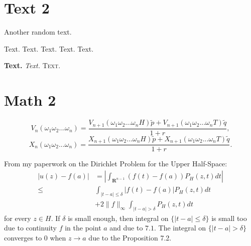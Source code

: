 \documentclass{article}
\begin{document}
\section{Text 2}

Another random text.

\large{Text.} \Large{Text.} \LARGE{Text.} \Large{Text.} \large{Text.}

\textbf{Text.} \textit{Text.} \textsc{Text.}

\section{Math 2}

\begin{equation}\nonumber
    V_{n}(\omega_1\omega_2...\omega_n)=\frac{V_{n+1}(\omega_1\omega_2...\omega_n H)\widetilde{p} + V_{n+1}(\omega_1\omega_2...\omega_n T)\widetilde{q}}{1+r},
\end{equation}
\begin{equation}\nonumber
    X_{n}(\omega_1\omega_2...\omega_n)=\frac{X_{n+1}(\omega_1\omega_2...\omega_n H)\widetilde{p} + X_{n+1}(\omega_1\omega_2...\omega_n T)\widetilde{q}}{1+r}.
\end{equation}


From my paperwork on the Dirichlet Problem for the Upper Half-Space:
\[
\begin{aligned}
|u(z)-f(a)|&=\left|\int_{\mathbf{R}^{n-1}}(f(t)-f(a)) P_{H}(z, t) d t\right| \\
\leq & \int_{|t-a| \leq \delta}|f(t)-f(a)| P_{H}(z, t) d t \\
&+2\|f\|_{\infty} \int_{|t-a|>\delta} P_{H}(z, t) d t
\end{aligned}
\]
for every $z \in H .$ If $\delta$ is small enough, then integral on $\{|t-a| \leq \delta\}$ is small too due to continuity $f$ in the point $a$ and due to $7.1 .$ The integral on $\{|t-a|>\delta\}$ converges to 0 when $z \to a$ due to the Proposition 7.2.
\end{document}
